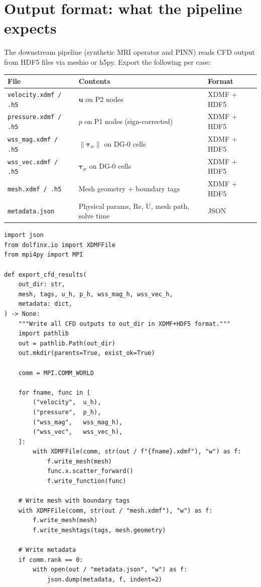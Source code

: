 \documentclass[11pt]{article}
\begin{document}
\section{Output format: what the pipeline expects}

The downstream pipeline (synthetic MRI operator and PINN) reads CFD
output from HDF5 files via meshio or h5py. Export the following per case:

\begin{center}
\begin{tabular}{lll}
\toprule
\textbf{File} & \textbf{Contents} & \textbf{Format} \\
\midrule
\texttt{velocity.xdmf / .h5} & $\mathbf{u}$ on P2 nodes & XDMF + HDF5 \\
\texttt{pressure.xdmf / .h5} & $p$ on P1 nodes (sign-corrected) & XDMF + HDF5 \\
\texttt{wss\_mag.xdmf / .h5} & $\|\boldsymbol{\tau}_w\|$ on DG-0 cells & XDMF + HDF5 \\
\texttt{wss\_vec.xdmf / .h5} & $\boldsymbol{\tau}_w$ on DG-0 cells & XDMF + HDF5 \\
\texttt{mesh.xdmf / .h5} & Mesh geometry + boundary tags & XDMF + HDF5 \\
\texttt{metadata.json} & Physical params, Re, U, mesh path, solve time & JSON \\
\bottomrule
\end{tabular}
\end{center}

\begin{lstlisting}
import json
from dolfinx.io import XDMFFile
from mpi4py import MPI

def export_cfd_results(
    out_dir: str,
    mesh, tags, u_h, p_h, wss_mag_h, wss_vec_h,
    metadata: dict,
) -> None:
    """Write all CFD outputs to out_dir in XDMF+HDF5 format."""
    import pathlib
    out = pathlib.Path(out_dir)
    out.mkdir(parents=True, exist_ok=True)

    comm = MPI.COMM_WORLD

    for fname, func in [
        ("velocity",  u_h),
        ("pressure",  p_h),
        ("wss_mag",   wss_mag_h),
        ("wss_vec",   wss_vec_h),
    ]:
        with XDMFFile(comm, str(out / f"{fname}.xdmf"), "w") as f:
            f.write_mesh(mesh)
            func.x.scatter_forward()
            f.write_function(func)

    # Write mesh with boundary tags
    with XDMFFile(comm, str(out / "mesh.xdmf"), "w") as f:
        f.write_mesh(mesh)
        f.write_meshtags(tags, mesh.geometry)

    # Write metadata
    if comm.rank == 0:
        with open(out / "metadata.json", "w") as f:
            json.dump(metadata, f, indent=2)
\end{lstlisting}
\end{document}
